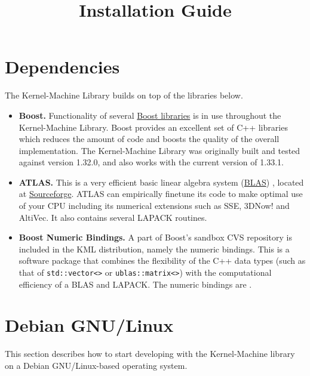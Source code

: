 \documentclass{article}
\begin{document}
\title{Installation Guide}
\maketitle

\tableofcontents


\section{Dependencies}

The Kernel-Machine Library builds on top of the libraries below.

\begin{itemize}
\item \textbf{Boost.} Functionality of several \href{http://www.boost.org/}{Boost libraries} is 
in use throughout the Kernel-Machine Library. 
Boost provides
an excellent set of C++ libraries which reduces the amount of code and boosts 
the quality of the overall implementation.
The Kernel-Machine Library was originally built and tested against version 1.32.0, and also works 
with the current version of 1.33.1. 

\item \textbf{ATLAS.} This is a very efficient basic linear algebra system 
(\href{http://www.netlib.org/blas/faq.html}{BLAS}) \cite{whaley01automated}, located at
\href{http://math-atlas.sourceforge.net}{Sourceforge}. 
ATLAS can empirically finetune 
its code to make optimal use of your CPU 
including its numerical extensions such as SSE, 3DNow! and AltiVec. 
It also contains several LAPACK routines. 

\item \textbf{Boost Numeric Bindings.} A part of Boost's sandbox CVS repository is 
included in the KML distribution, 
namely the numeric bindings. 
This is a software package that combines the flexibility of the C++ data types (such as that of 
\texttt{std::vector<>} or \texttt{ublas::matrix<>}) with the computational 
efficiency of a BLAS and LAPACK. The numeric bindings are .

\end{itemize}


\section{Debian GNU/Linux}

This section describes how to start developing with
the Kernel-Machine library on a Debian GNU/Linux-based operating system.
\end{document}
